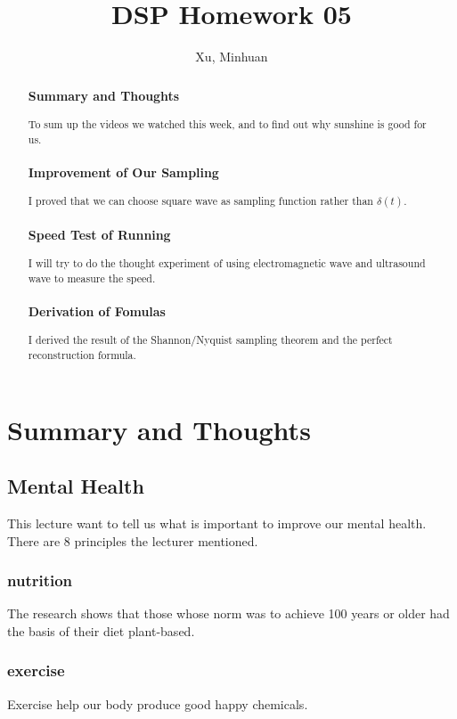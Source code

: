 \documentclass{article}
\begin{document}
\title{DSP Homework 05}
\author{Xu, Minhuan}
\maketitle
\tableofcontents
\begin{abstract}
    \subsubsection*{Summary and Thoughts} To sum up the videos we watched this
     week, and to find out why sunshine is good for us.
    \subsubsection*{Improvement of Our Sampling} I proved that we can choose
     square wave as sampling function rather than $\delta(t)$.
    \subsubsection*{Speed Test of Running} I will try to do the thought
     experiment of using electromagnetic wave and ultrasound wave to measure
     the speed.
    \subsubsection*{Derivation of Fomulas} I derived the result of the
     Shannon/Nyquist sampling theorem and the perfect reconstruction
     formula.
\end{abstract}

\section{Summary and Thoughts}

\subsection{Mental Health} This lecture want to tell us what is important to
 improve our mental health. There are 8 principles the lecturer mentioned.
\subsubsection*{nutrition} The research shows that those whose norm was to
 achieve 100 years or older had the basis of their diet plant-based.
\subsubsection*{exercise} Exercise help our body produce good happy
 chemicals.
\end{document}
